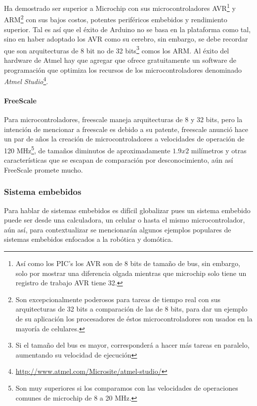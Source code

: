\documentclass{article}
\begin{document}
Ha demostrado ser superior a Microchip con sus microcontroladores 
AVR\footnote{Así como los PIC's los AVR son de 8 bits
de tamaño de bus, sin embargo, solo por mostrar una diferencia olgada
 mientras que microchip solo tiene un registro de trabajo AVR tiene 32.} y ARM\footnote{Son excepcionalmente poderosos para tareas de tiempo real
		 con sus arquitecturas de 32 bits a comparación de las de 8 bits,
 para dar un ejemplo de su aplicación los procesadores de éstos 
 microcontroladores son usados en la mayoría de celulares.} con sus bajos
 costos, potentes periféricos embebidos y rendimiento superior. Tal es así
 que el éxito de Arduino no se basa en la plataforma como tal, sino en 
 haber adoptado los AVR como su cerebro, sin embargo, se debe recordar que
 son arquitecturas de 8 bit no de 32 bits\footnote{Si el tamaño del bus
		 es mayor, corresponderá a hacer más tareas en paralelo, aumentando
 su velocidad de ejecución} comos los ARM. Al éxito del hardware de Atmel
 hay que agregar que ofrece gratuitamente un software de programación
 que optimiza los recursos de los microcontroladores denominado 
 \textit{Atmel Studio}\footnote{\url{http://www.atmel.com/Microsite/atmel-studio/}}. 

\paragraph{FreeScale}

Para microcontroladores, freescale maneja arquitecturas de 8 y 32 bits, pero
la intención de mencionar a freescale es debido a su patente, freescale
anunció hace un par de años la creación de microcontroladores a velocidades
de operación de 120 MHz\footnote{Son muy superiores si los comparamos con
las velocidades de operaciones comunes de microchip de 8 a 20 MHz.}, de 
tamaños diminutos de aproximadamente $1.9 x 2$ milímetros y otras 
características que se escapan de comparación por desconocimiento, aún así
FreeScale promete mucho.

\subsubsection{Sistema embebidos}

Para hablar de sistemas embebidos es difícil globalizar pues un sistema
embebido puede ser desde una calculadora, un celular o hasta el mismo 
microcontrolador, aún así, para contextualizar se mencionarán algunos
ejemplos populares de sistemas embebidos enfocados a la robótica y domótica.
\end{document}

